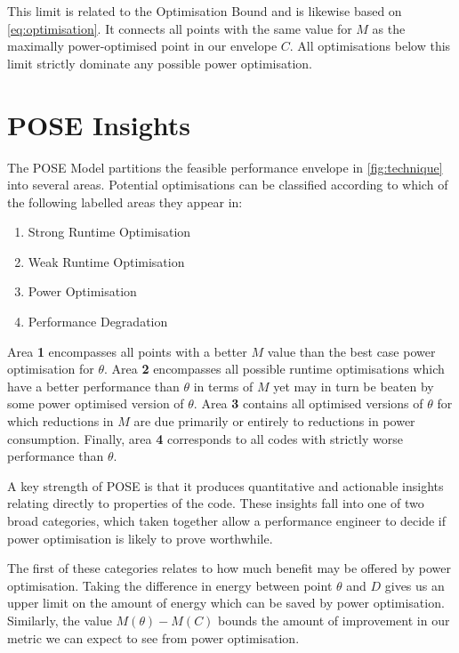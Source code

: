 This limit is related to the Optimisation Bound and is likewise based on \autoref{eq:optimisation}.
It connects all points with the same value for $M$ as the maximally power-optimised point in our envelope $C$.
All optimisations below this limit strictly dominate any possible power optimisation.

\section{POSE Insights}
\label{sec:insights}
The POSE Model partitions the feasible performance envelope in \autoref{fig:technique} into several areas.
Potential optimisations can be classified according to which of the following labelled areas they appear in:
\begin{multicols}{2}
\begin{enumerate}
\item Strong Runtime Optimisation
\item Weak Runtime Optimisation
\item Power Optimisation
\item Performance Degradation  
\end{enumerate}
\end{multicols}
Area \textbf{1} encompasses all points with a better $M$ value than the best case power optimisation for $\theta$.
Area \textbf{2} encompasses all possible runtime optimisations which have a better performance than $\theta$ in terms of $M$ yet may in turn be beaten by some power optimised version of $\theta$.
Area \textbf{3} contains all optimised versions of $\theta$ for which reductions in $M$ are due primarily or entirely to reductions in power consumption.
Finally, area \textbf{4} corresponds to all codes with strictly worse performance than $\theta$.

A key strength of POSE is that it produces quantitative and actionable insights relating directly to properties of the code.
These insights fall into one of two broad categories, which taken together allow a performance engineer to decide if power optimisation is likely to prove worthwhile.

The first of these categories relates to how much benefit may be offered by power optimisation.
Taking the difference in energy between point $\theta$ and $D$ gives us an upper limit on the amount of energy which can be saved by power optimisation. 
Similarly, the value $M(\theta) - M(C)$ bounds the amount of improvement in our metric we can expect to see from power optimisation.


